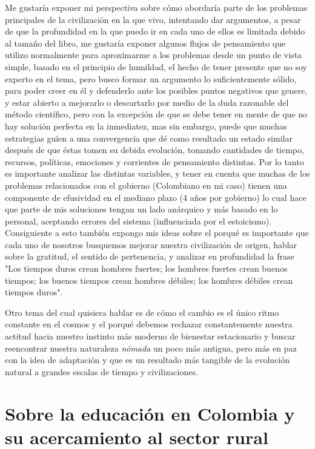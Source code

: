 \documentclass{article}
\begin{document}
Me gustaría exponer mi perspectiva sobre cómo abordaría parte de los problemas principales de la civilización en la que vivo, intentando dar argumentos, a pesar de que la profundidad en la que puedo ir en cada uno de ellos es limitada debido al tamaño del libro, me gustaría exponer algunos flujos de pensamiento que utilizo normalmente para aproximarme a los problemas desde un punto de vista simple, basado en el principio de humildad, el hecho de tener presente que no soy experto en el tema, pero busco formar un argumento lo suficientemente sólido, para poder creer en él y defenderlo ante los posibles puntos negativos que genere, y estar abierto a mejorarlo o descartarlo por medio de la duda razonable del método científico, pero con la excepción de que se debe tener en mente de que no hay solución perfecta en la inmediatez, mas sin embargo, puede que muchas estrategias guíen a una convergencia que dé como resultado un estado similar después de que éstas tomen su debida evolución, tomando cantidades de tiempo, recursos, políticas, emociones y corrientes de pensamiento distintas. Por lo tanto es importante analizar las distintas variables, y tener en cuenta que muchas de los problemas relacionados con el gobierno (Colombiano en mi caso) tienen una componente de efusividad en el mediano plazo (4 años por gobierno) lo cual hace que parte de mis soluciones tengan un lado anárquico y más basado en lo personal, aceptando errores del sistema (influenciada por el estoicismo). \\

Consiguiente a esto también expongo mis ideas sobre el porqué es importante que cada uno de nosotros busquemos mejorar nuestra civilización de origen, hablar sobre la gratitud, el sentido de pertenencia, y analizar en profundidad la frase "Los tiempos duros crean hombres fuertes; los hombres fuertes crean buenos tiempos; los buenos tiempos crean hombres débiles; los hombres débiles crean tiempos duros".

Otro tema del cual quisiera hablar es de cómo el cambio es el único ritmo constante en el cosmos y el porqué debemos rechazar constantemente nuestra actitud hacia nuestro instinto más moderno de bienestar estacionario y buscar reencontrar nuestra naturaleza \textit{nómada} un poco más antigua, pero más en paz con la idea de adaptación y que es un resultado más tangible de la evolución natural a grandes escalas de tiempo y civilizaciones.



\section{Sobre la educación en Colombia y su acercamiento al sector rural}
\end{document}
